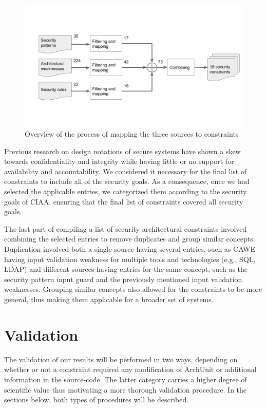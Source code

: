\begin{figure}
    \centering
    \includegraphics[width=\textwidth]{figure/Half-time presentation.png}
    \caption{Overview of the process of mapping the three sources to constraints}
    \label{fig:mapping_process}
\end{figure}

Previous research on design notations of secure systems have shown a skew towards confidentiality and integrity while having little or no support for availability and accountability. We considered it necessary for the final list of constraints to include all of the security goals. As a consequence, once we had selected the applicable entries, we categorized them according to the security goals of CIAA, ensuring that the final list of constraints covered all security goals. 

The last part of compiling a list of security architectural constraints involved combining the selected entries to remove duplicates and group similar concepts. Duplication involved both a single source having several entries, such as CAWE having input validation weakness for multiple tools and technologies (e.g., SQL, LDAP) and different sources having entries for the same concept, such as the security pattern input guard and the previously mentioned input validation weaknesses. Grouping similar concepts also allowed for the constraints to be more general, thus making them applicable for a broader set of systems. 

\section{Validation}

The validation of our results will be performed in two ways, depending on whether or not a constraint required any modification of ArchUnit or additional information in the source-code. The latter category carries a higher degree of scientific value thus motivating a more thorough validation procedure. In the sections below, both types of procedures will be described. 

